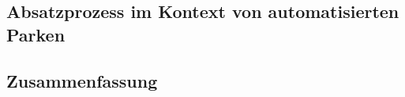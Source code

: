 \subsection{Absatzprozess im Kontext von automatisierten Parken}\label{absatzprozess}

\subsection{Zusammenfassung}